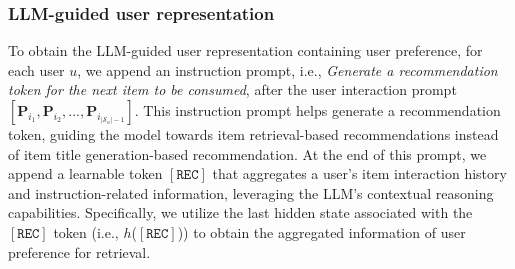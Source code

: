 \documentclass[sigconf]{acmart}
\newcommand{\rectoken}{$\left[ \texttt{REC} \right]$}
\begin{document}
\subsubsection{\textbf{LLM-guided user representation}} 
To obtain the LLM-guided user representation containing user preference, for each user $u$, we append an instruction prompt, i.e., \textit{Generate a recommendation token for the next item to be consumed}, after the user interaction prompt $[\mathbf{P}_{i_1}, \mathbf{P}_{i_2}, ..., \mathbf{P}_{i_{|\mathcal{S}_u|-1}}]$. This instruction prompt helps generate a recommendation token, guiding the model towards item retrieval-based recommendations instead of item title generation-based recommendation. At the end of this prompt, we append a learnable token \rectoken{} that aggregates a user's item interaction history and instruction-related information, leveraging the LLM's contextual reasoning capabilities. Specifically, we utilize the last hidden state associated with the \rectoken{} token (i.e., $h$(\rectoken{})) to obtain the aggregated information of user preference for retrieval.  
\end{document}
